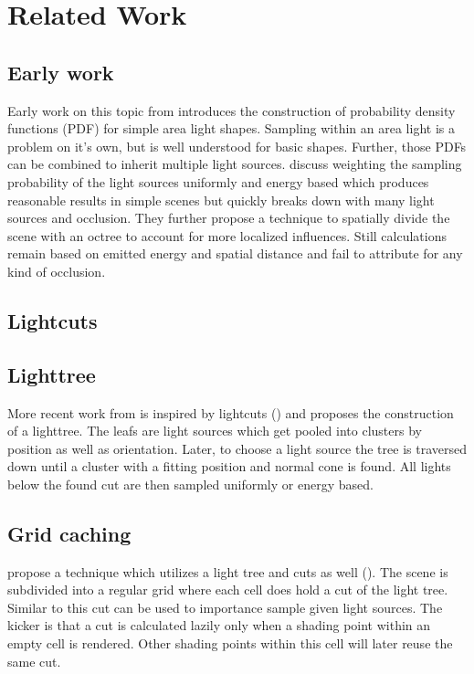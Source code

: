 \chapter{Related Work}
\label{ch:Prev}

\section{Early work}

Early work on this topic from \cite{Shirley:1996:MCT:226150.226151} introduces the construction of probability density functions (PDF) for simple area light shapes. Sampling within an area light is a problem on it's own, but is well understood for basic shapes. Further, those PDFs can be combined to inherit multiple light sources. \cite{Shirley:1996:MCT:226150.226151} discuss weighting the sampling probability of the light sources uniformly and energy based which produces reasonable results in simple scenes but quickly breaks down with many light sources and occlusion. They further propose a technique to spatially divide the scene with an octree to account for more localized influences. Still calculations remain based on emitted energy %
and spatial distance and fail to attribute for any kind of occlusion.

\section{Lightcuts}

\section{Lighttree}

More recent work from \cite{Estevez:2017:ISM:3084363.3085028} is inspired by lightcuts (\cite{Walter2005LightcutsAS}) and proposes the construction of a lighttree. The leafs are light sources which get pooled into clusters by position as well as orientation. Later, to choose a  light source the tree is traversed down until a cluster with a fitting position and normal cone is found. All lights below the found cut are then sampled uniformly or energy based.

\section{Grid caching}

\cite{Vevoda:2016:ADI:3005274.3005283} propose a technique which utilizes a light tree and cuts as well (\cite{Walter2005LightcutsAS}). The scene is subdivided into a regular grid where each cell does hold a cut of the light tree. Similar to \cite{Estevez:2017:ISM:3084363.3085028} this cut can be used to importance sample given light sources. The kicker is that a cut is calculated lazily only when a shading point within an empty cell is rendered. Other shading points within this cell will later reuse the same cut.

